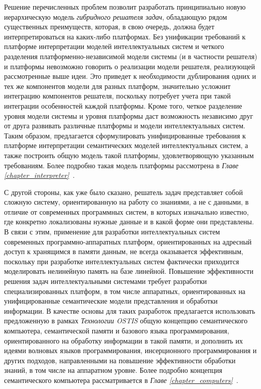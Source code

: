 Решение перечисленных проблем позволит разработать принципиально новую иерархическую модель \textit{гибридного решателя задач}, обладающую рядом существенных преимуществ, которая, в свою очередь, должна будет интерпретироваться на каких-либо платформах. Без унификации требований к платформе интерпретации моделей интеллектуальных систем и четкого разделения платформенно-независимой модели системы (и в частности решателя) и платформы невозможно говорить о реализации модели решателя, реализующей рассмотренные выше идеи. Это приведет к необходимости дублирования одних и тех же компонентов модели для разных платформ, значительно усложнит интеграцию компонентов решателя, поскольку потребует учета при такой интеграции особенностей каждой платформы. Кроме того, четкое разделение уровня модели системы и уровня платформы даст возможность независимо друг от друга развивать различные платформы и модели интеллектуальных систем. Таким образом, предлагается сформулировать унифицированные требования к платформе интерпретации семантических моделей интеллектуальных систем, а также построить общую модель такой платформы, удовлетворяющую указанным требованиям. Более подробно такая модель платформы рассмотрена в \textit{Главе \ref{chapter_interpreter}~}.

С другой стороны, как уже было сказано, решатель задач представляет собой сложную систему, ориентированную на работу со знаниями, а не с данными, в отличие от современных программных систем, в которых изначально известно, где конкретно локализованы нужные данные и в какой форме они представлены. В связи с этим, применение для разработки интеллектуальных систем современных программно-аппаратных платформ, ориентированных на адресный доступ к хранящимся в памяти данным, не всегда оказывается эффективным, поскольку при разработке интеллектуальных систем фактически приходится моделировать нелинейную память на базе линейной. Повышение эффективности решения задач интеллектуальными системами требует разработки специализированных платформ, в том числе аппаратных, ориентированных на унифицированные семантические модели представления и обработки информации. В качестве основы для таких разработок предлагается использовать предложенную в рамках \textit{Технологии OSTIS} общую концепцию семантического компьютера, семантической памяти и базового языка программирования, ориентированного на обработку информации в такой памяти, и дополнить их идеями волновых языков программирования, инсерционного программирования и других подходов, направленными на повышение эффективности обработки знаний, в том числе на аппаратном уровне. Более подробно концепция семантического компьютера рассматривается в \textit{Главе \ref{chapter_computers}~}. 

